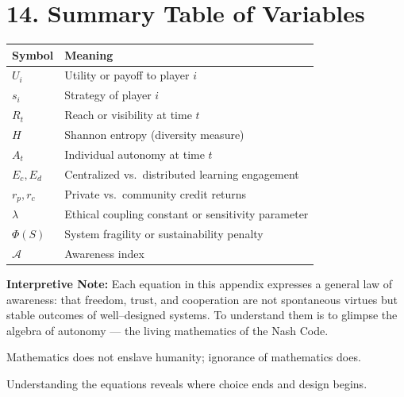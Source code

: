 \documentclass[12pt,twoside]{book}
\begin{document}
\newpage
\section*{14. Summary Table of Variables}

\begin{center}
\begin{tabular}{@{}ll@{}}
\toprule
\textbf{Symbol} & \textbf{Meaning} \\
\midrule
$U_i$ & Utility or payoff to player $i$ \\
$s_i$ & Strategy of player $i$ \\
$R_t$ & Reach or visibility at time $t$ \\
$H$ & Shannon entropy (diversity measure) \\
$A_t$ & Individual autonomy at time $t$ \\
$E_c,E_d$ & Centralized vs.\ distributed learning engagement \\
$r_p,r_c$ & Private vs.\ community credit returns \\
$\lambda$ & Ethical coupling constant or sensitivity parameter \\
$\Phi(S)$ & System fragility or sustainability penalty \\
$\mathcal{A}$ & Awareness index \\
\bottomrule
\end{tabular}
\end{center}

\bigskip
\noindent
\textbf{Interpretive Note:}  
Each equation in this appendix expresses a general law of awareness: that freedom, trust, and cooperation are not spontaneous virtues but stable outcomes of well–designed systems.  
To understand them is to glimpse the algebra of autonomy — the living mathematics of the Nash Code.

\bigskip
\begin{keyidea}
Mathematics does not enslave humanity; ignorance of mathematics does.
\end{keyidea}

\begin{keyidea}
Understanding the equations reveals where choice ends and design begins.
\end{keyidea}
\end{document}
